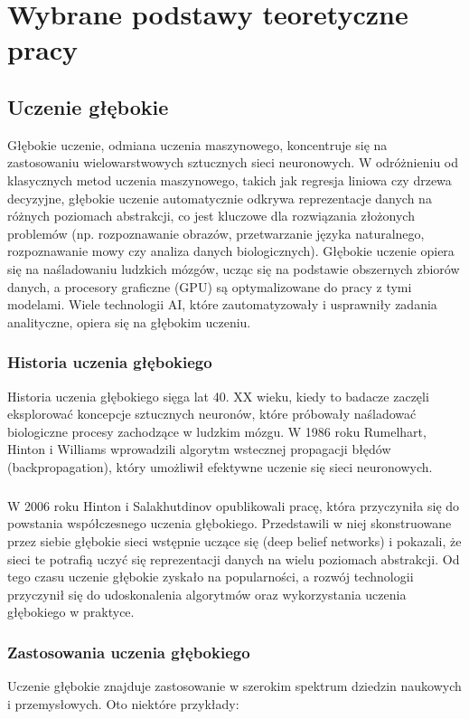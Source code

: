 \chapter{Wybrane podstawy teoretyczne pracy}

\section{Uczenie głębokie}

Głębokie uczenie, odmiana uczenia maszynowego, koncentruje się na zastosowaniu wielowarstwowych sztucznych sieci neuronowych. W odróżnieniu od klasycznych metod uczenia maszynowego, takich jak regresja liniowa czy drzewa decyzyjne, głębokie uczenie automatycznie odkrywa reprezentacje danych na różnych poziomach abstrakcji, co jest kluczowe dla rozwiązania złożonych problemów (np. rozpoznawanie obrazów, przetwarzanie języka naturalnego, rozpoznawanie mowy czy analiza danych biologicznych). Głębokie uczenie opiera się na naśladowaniu ludzkich mózgów, ucząc się na podstawie obszernych zbiorów danych, a procesory graficzne (GPU) są optymalizowane do pracy z tymi modelami. Wiele technologii AI, które zautomatyzowały i usprawniły zadania analityczne, opiera się na głębokim uczeniu.

\subsection{Historia uczenia głębokiego}
Historia uczenia głębokiego sięga lat 40. XX wieku, kiedy to badacze zaczęli eksplorować koncepcje sztucznych neuronów, które próbowały naśladować biologiczne procesy zachodzące w ludzkim mózgu. W 1986 roku Rumelhart, Hinton i Williams wprowadzili algorytm wstecznej propagacji błędów (backpropagation), który umożliwił efektywne uczenie się sieci neuronowych.
\paragraph{}
W 2006 roku Hinton i Salakhutdinov opublikowali pracę, która przyczyniła się do powstania współczesnego uczenia głębokiego. Przedstawili w niej skonstruowane przez siebie głębokie sieci wstępnie uczące się (deep belief networks) i pokazali, że sieci te potrafią uczyć się reprezentacji danych na wielu poziomach abstrakcji. Od tego czasu uczenie głębokie zyskało na popularności, a rozwój technologii przyczynił się do udoskonalenia algorytmów oraz wykorzystania uczenia głębokiego w praktyce.

\subsection{Zastosowania uczenia głębokiego}
Uczenie głębokie znajduje zastosowanie w szerokim spektrum dziedzin naukowych i przemysłowych. Oto niektóre przykłady:

